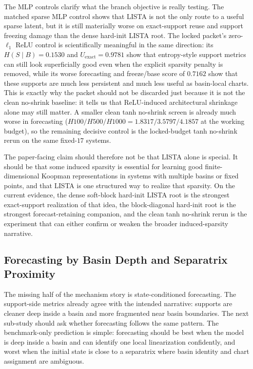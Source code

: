 The MLP controls clarify what the branch objective is really testing. The
matched sparse MLP control shows that LISTA is not the only route to a useful
sparse latent, but it is still materially worse on exact-support reuse and
support freezing damage than the dense hard-init LISTA root. The locked
packet's zero-$\ell_1$ ReLU control is scientifically meaningful in the same
direction: its $H(S \mid B)=0.1530$ and $U_{\mathrm{exact}}=0.9781$ show that
entropy-style support metrics can still look superficially good even when the
explicit sparsity penalty is removed, while its worse forecasting and
freeze/base score of $0.7162$ show that these supports are much less
persistent and much less useful as basin-local charts. This is exactly why the
packet should not be discarded just because it is not the clean no-shrink
baseline: it tells us that ReLU-induced architectural shrinkage alone may still
matter. A smaller clean tanh no-shrink screen is already much worse in
forecasting (\(H100/H500/H1000 = 1.8317 / 3.5797 / 4.1857\) at the working
budget), so the remaining decisive control is the locked-budget tanh no-shrink
rerun on the same fixed-$17$ systems.

The paper-facing claim should therefore not be that LISTA alone is special. It
should be that some induced sparsity is essential for learning good
finite-dimensional Koopman representations in systems with multiple basins or
fixed points, and that LISTA is one structured way to realize that sparsity.
On the current evidence, the dense soft-block hard-init LISTA root is the
strongest exact-support realization of that idea, the block-diagonal hard-init
root is the strongest forecast-retaining companion, and the clean tanh
no-shrink rerun is the experiment that can either confirm or weaken the
broader induced-sparsity narrative.

\subsection{Forecasting by Basin Depth and Separatrix Proximity}
\label{sec:fixed17-depth-forecast}

The missing half of the mechanism story is state-conditioned forecasting. The
support-side metrics already agree with the intended narrative: supports are
cleaner deep inside a basin and more fragmented near basin boundaries. The
next sub-study should ask whether forecasting follows the same pattern. The
benchmark-only prediction is simple: forecasting should be best when the model
is deep inside a basin and can identify one local linearization confidently,
and worst when the initial state is close to a separatrix where basin identity
and chart assignment are ambiguous.

